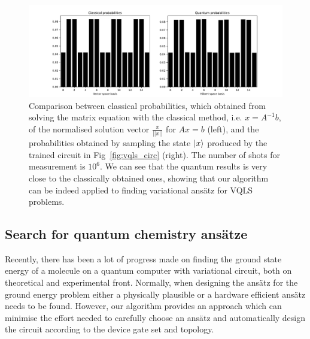 \documentclass{ieeeaccess}
\begin{document}
  \begin{figure}[ht!]
    \centering
    \includegraphics[width=\linewidth]{peiyong_fig_8.pdf}
    \caption{Comparison between classical probabilities, which obtained from solving the matrix equation with the classical method, i.e. $x = A^{-1}b$, of the normalised solution vector $\frac{x}{||x||}$ for $Ax = b$ (left), and the probabilities obtained by sampling the state $\ket{x}$ produced by the trained circuit in Fig~\ref{fig:vqls_circ} (right). The number of shots for measurement is $10^6$. We can see that the quantum results is very close to the classically obtained ones, showing that our algorithm can be indeed applied to finding variational ans\"atz for VQLS problems.}
    \label{fig:vqls_results_compare}
  \end{figure}

  \subsection{Search for quantum chemistry ans\"atze}\label{h2}


  Recently, there has been a lot of progress made on finding the ground state energy of a molecule on a quantum computer with variational circuit, both on theoretical \cite{li2017efficient,mcclean2016theory,wecker2015progress} and experimental \cite{peruzzo2014variational,o2016scalable, colless2017implementing, kandala2017hardware, colless2018computation, dumitrescu2018cloud} front. 
  Normally, when designing the ans\"atz for the ground energy problem either a physically plausible or a hardware efficient ans\"atz needs to be found. However, our algorithm provides an approach which can minimise the effort needed to carefully choose an ans\"atz and automatically design the circuit according to the device gate set and topology.
  
\end{document}
